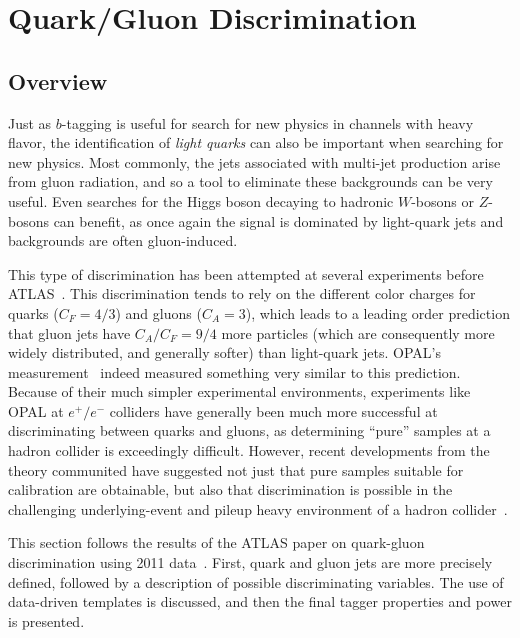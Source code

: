 \label{chapter:color}


\section{Quark/Gluon Discrimination}
\label{jet-reconstruction:qg}
\subsection{Overview}
\label{jet-reconstruction:qg:overview}

Just as $b$-tagging is useful for search for new physics in channels with heavy flavor, the identification of \textit{light quarks} can also be important when searching for new physics. Most commonly, the jets associated with multi-jet production arise from gluon radiation, and so a tool to eliminate these backgrounds can be very useful. Even searches for the Higgs boson decaying to hadronic $W$-bosons or $Z$-bosons can benefit, as once again the signal is dominated by light-quark jets and backgrounds are often gluon-induced.

This type of discrimination has been attempted at several experiments before ATLAS~\cite{TevatronShapes1,QGNN,Pumplin,QGopal,Ariel,QGsub,QGlep,QGcleo,DelphiQG,DelphiQG2,AlephQG,L3QG}. This discrimination tends to rely on the different color charges for quarks ($C_F=4/3$) and gluons ($C_A=3$), which leads to a leading order prediction that gluon jets have $C_A/C_F = 9/4$ more particles (which are consequently more widely distributed, and generally softer) than light-quark jets. OPAL's measurement~\cite{QGopal} indeed measured something very similar to this prediction. Because of their much simpler experimental environments, experiments like OPAL at $e^+/e^-$ colliders have generally been much more successful at discriminating between quarks and gluons, as determining ``pure'' samples at a hadron collider is exceedingly difficult. However, recent developments from the theory communited have suggested not just that pure samples suitable for calibration are obtainable, but also that discrimination is possible in the challenging underlying-event and pileup heavy environment of a hadron collider~\cite{schwartz1,schwartz2}. 

This section follows the results of the ATLAS paper on quark-gluon discrimination using 2011 data~\cite{ATLASqg}. First, quark and gluon jets are more precisely defined, followed by a description of possible discriminating variables. The use of data-driven templates is discussed, and then the final tagger properties and power is presented.

